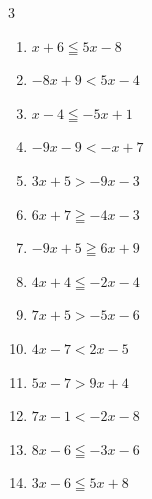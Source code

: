 \begin{multicols}{3}
\begin{enumerate}
\columnbreak %

  \item $x+6\leqq 5x-8$


  \item $-8x+9<5x-4$

        \phantom{$\displaystyle x>1$}

  \item $x-4\leqq -5x+1$


  \item $-9x-9<-x+7$

        \phantom{$\displaystyle x>-2$}

  \item $3x+5>-9x-3$


  \item $6x+7\geqq -4x-3$

        \phantom{$\displaystyle x\geqq -1$}

  \item $-9x+5\geqq 6x+9$


  \item $4x+4\leqq -2x-4$


  \item $7x+5>-5x-6$


  \item $4x-7<2x-5$

        \phantom{$\displaystyle x<1$}

  \item $5x-7>9x+4$


  \item $7x-1<-2x-8$


  \item $8x-6\leqq -3x-6$

        \phantom{$\displaystyle x\leqq 0$}

  \item $3x-6\leqq 5x+8$


\end{enumerate}
\end{multicols}
